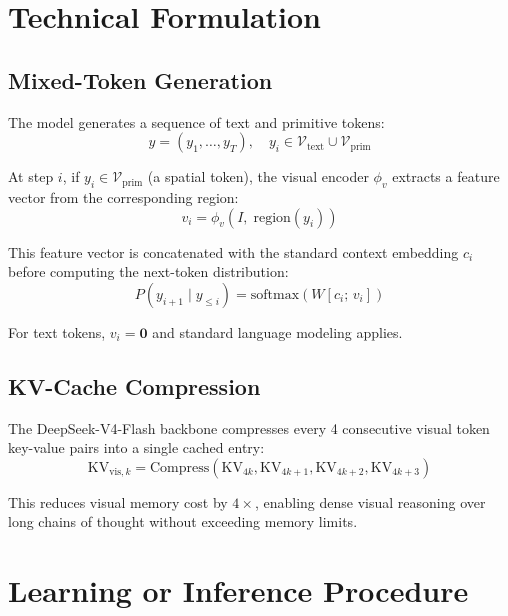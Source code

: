 \documentclass[10pt,twocolumn]{article}
\begin{document}
\section{Technical Formulation}

\subsection*{Mixed-Token Generation}

The model generates a sequence of text and primitive tokens:
\begin{equation}
y = (y_1, \ldots, y_T),\quad y_i \in \mathcal{V}_{\mathrm{text}} \cup \mathcal{V}_{\mathrm{prim}}
\label{eq:gen}
\end{equation}

At step $i$, if $y_i \in \mathcal{V}_{\mathrm{prim}}$ (a spatial token), the visual encoder $\phi_v$ extracts a feature vector from the corresponding region:
\begin{equation}
v_i = \phi_v\!\left(I,\; \mathrm{region}(y_i)\right)
\label{eq:feat}
\end{equation}

This feature vector is concatenated with the standard context embedding $c_i$ before computing the next-token distribution:
\begin{equation}
P(y_{i+1} \mid y_{\leq i}) = \mathrm{softmax}\!\left(W [c_i;\, v_i]\right)
\label{eq:ntp}
\end{equation}

For text tokens, $v_i = \mathbf{0}$ and standard language modeling applies.

\subsection*{KV-Cache Compression}

The DeepSeek-V4-Flash backbone compresses every 4 consecutive visual token key-value pairs into a single cached entry:
\begin{equation}
\mathrm{KV}_{\mathrm{vis},k} = \mathrm{Compress}\!\left(\mathrm{KV}_{4k}, \mathrm{KV}_{4k+1}, \mathrm{KV}_{4k+2}, \mathrm{KV}_{4k+3}\right)
\label{eq:kv}
\end{equation}

This reduces visual memory cost by $4\times$, enabling dense visual reasoning over long chains of thought without exceeding memory limits.

\section{Learning or Inference Procedure}
\end{document}
